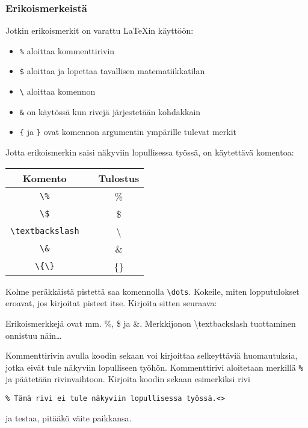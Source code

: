 \begin{fframe}
    \frametitle{Erikoismerkeistä}
    Jotkin erikoismerkit on varattu \LaTeX in käyttöön:
    \begin{itemize}[<+->]
        \item \lstinline-%- aloittaa kommenttirivin
        \item \lstinline-$- aloittaa ja lopettaa tavallisen matematiikkatilan
        \item \lstinline-\- aloittaa komennon %
        \item \lstinline-&- on käytössä kun rivejä järjestetään kohdakkain
        \item \lstinline-{- ja \lstinline-}- ovat komennon argumentin ympärille tulevat merkit
    \end{itemize}\pause
    Jotta erikoismerkin saisi näkyviin lopullisessa työssä, on käytettävä komentoa:
    \begin{table}[H]
        \begin{tabular}{ccc}
            Komento & & Tulostus\\
            \hline
            \verb-\%- & & \%\\
            \verb-\$- & & \$\\
            \verb-\textbackslash- & & \textbackslash\\
            \verb-\&- & & \&\\
            \verb-\{\}- & & \{\}
        \end{tabular}
    \end{table}
\end{fframe}

\begin{fframe}
    \begin{harj}
        Kolme peräkkäistä pistettä saa komennolla \lstinline-\dots-. Kokeile, miten lopputulokset eroavat, jos kirjoitat pisteet itse.  Kirjoita sitten seuraava:
        \begin{sample}
            Erikoismerkkejä ovat mm. \%, \$ ja \&. Merkkijonon \textbackslash textbackslash tuottaminen onnistuu näin\dots
        \end{sample}
    \end{harj}
    \begin{harj}
        Kommenttirivin avulla koodin sekaan voi kirjoittaa selkeyttäviä huomautuksia, jotka eivät tule näkyviin lopulliseen työhön. Kommenttirivi aloitetaan merkillä \lstinline-%- ja päätetään rivinvaihtoon. 
        \vaihto
        Kirjoita koodin sekaan esimerkiksi rivi
        \begin{lstlisting}
% Tämä rivi ei tule näkyviin lopullisessa työssä.<>
        \end{lstlisting}
        ja testaa, pitääkö väite paikkansa.
    \end{harj}
\end{fframe}

